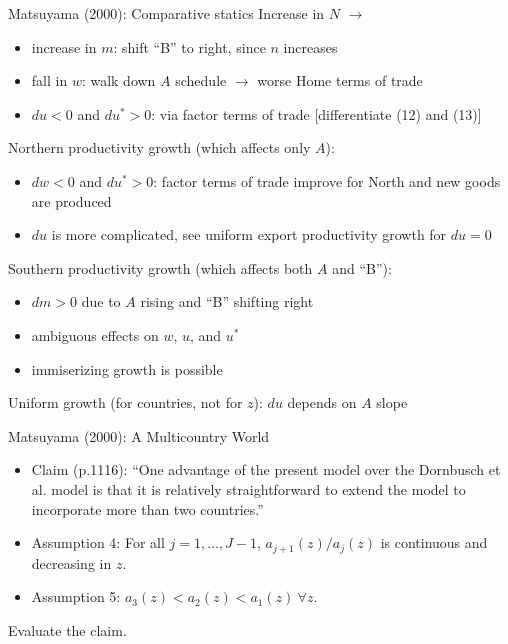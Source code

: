 \documentclass[10pt,notes=hide]{beamer}
\begin{document}
\begin{frame}{Matsuyama (2000): Comparative statics}
Increase in $N$ $\to$
\begin{itemize}
	\item increase in $m$: shift ``B'' to right, since $n$ increases
	\item fall in $w$: walk down $A$ schedule $\to$ worse Home terms of trade
	\item $du < 0$ and $du^*>0$: via factor terms of trade [differentiate (12) and (13)]
\end{itemize}
Northern productivity growth (which affects only $A$):
\begin{itemize}
	\item $dw<0$ and $du^*>0$: factor terms of trade improve for North and new goods are produced
	\item $du$ is more complicated, see uniform export productivity growth for $du=0$
\end{itemize}
Southern productivity growth (which affects both $A$ and ``B''):
\begin{itemize}
	\item $dm>0$ due to $A$ rising and ``B'' shifting right
	\item ambiguous effects on $w$, $u$, and $u^*$
	\item immiserizing growth is possible
\end{itemize}
Uniform growth (for countries, not for $z$): $du$ depends on $A$ slope
\end{frame}
\begin{frame}{Matsuyama (2000): A Multicountry World}
\begin{itemize}
	\item Claim (p.1116): ``One advantage of the present model over the Dornbusch et al. model is that it is relatively straightforward to extend the model to incorporate more than two countries.''
	\item Assumption 4: For all $j=1,\dots,J-1$, $a_{j+1}(z)/a_{j}(z)$ is continuous and decreasing in $z$.
	\item Assumption 5: $a_3(z)<a_2(z)<a_1(z) \ \forall z$.
\end{itemize}
Evaluate the claim.
\end{frame}
\end{document}
